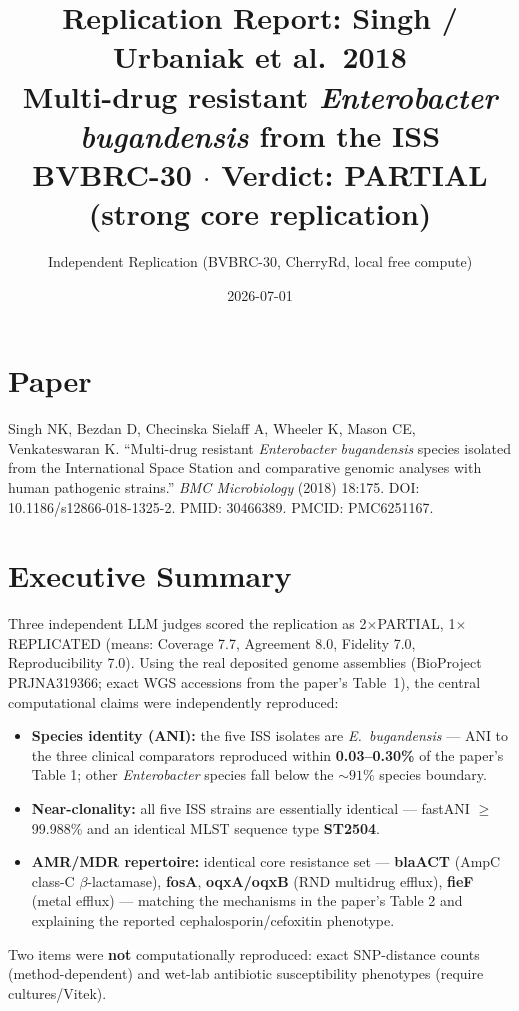 \documentclass[11pt]{article}
\title{Replication Report: Singh / Urbaniak et al.\ 2018 \\
\large Multi-drug resistant \textit{Enterobacter bugandensis} from the ISS \\
\normalsize BVBRC-30 $\cdot$ Verdict: \textbf{PARTIAL (strong core replication)}}
\author{Independent Replication (BVBRC-30, CherryRd, local free compute)}
\date{2026-07-01}
\begin{document}
\maketitle

\section*{Paper}
Singh NK, Bezdan D, Checinska Sielaff A, Wheeler K, Mason CE, Venkateswaran K.
``Multi-drug resistant \textit{Enterobacter bugandensis} species isolated from the International Space Station
and comparative genomic analyses with human pathogenic strains.''
\textit{BMC Microbiology} (2018) 18:175. DOI: 10.1186/s12866-018-1325-2. PMID: 30466389. PMCID: PMC6251167.

\section{Executive Summary}
Three independent LLM judges scored the replication as 2$\times$PARTIAL, 1$\times$REPLICATED
(means: Coverage 7.7, Agreement 8.0, Fidelity 7.0, Reproducibility 7.0).
Using the real deposited genome assemblies (BioProject PRJNA319366; exact WGS accessions from the paper's
Table~1), the central computational claims were independently reproduced:
\begin{itemize}[leftmargin=1.3em]
  \item \textbf{Species identity (ANI):} the five ISS isolates are \textit{E.~bugandensis} --- ANI to the three
        clinical comparators reproduced within \textbf{0.03--0.30\%} of the paper's Table 1;
        other \textit{Enterobacter} species fall below the ${\sim}91\%$ species boundary. \checkmark
  \item \textbf{Near-clonality:} all five ISS strains are essentially identical --- fastANI $\geq$99.988\%
        and an identical MLST sequence type \textbf{ST2504}. \checkmark
  \item \textbf{AMR/MDR repertoire:} identical core resistance set --- \textbf{blaACT} (AmpC class-C
        $\beta$-lactamase), \textbf{fosA}, \textbf{oqxA/oqxB} (RND multidrug efflux), \textbf{fieF} (metal efflux) ---
        matching the mechanisms in the paper's Table 2 and explaining the reported
        cephalosporin/cefoxitin phenotype. \checkmark
\end{itemize}
Two items were \textbf{not} computationally reproduced: exact SNP-distance counts (method-dependent)
and wet-lab antibiotic susceptibility phenotypes (require cultures/Vitek).
\end{document}
